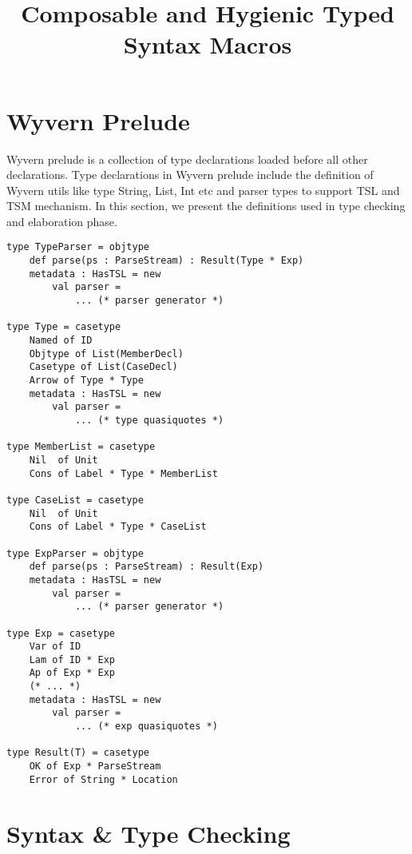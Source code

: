 \documentclass[letterpaper, notitlepage]{article}
\begin{document}
\title{Composable and Hygienic Typed Syntax Macros}
\maketitle

\section{Wyvern Prelude}
Wyvern prelude is a collection of type declarations loaded before all other declarations. Type declarations in Wyvern prelude include the definition of Wyvern utils like type String, List, Int etc and parser types to support TSL and TSM mechanism. In this section, we present the definitions used in type checking and elaboration phase. 
\begin{lstlisting}[style=wyvern]
type TypeParser = objtype
	def parse(ps : ParseStream) : Result(Type * Exp)
	metadata : HasTSL = new 
		val parser = 
			... (* parser generator *)

type Type = casetype
	Named of ID
	Objtype of List(MemberDecl)
	Casetype of List(CaseDecl)
	Arrow of Type * Type
	metadata : HasTSL = new
		val parser = 
			... (* type quasiquotes *)

type MemberList = casetype
	Nil  of Unit
	Cons of Label * Type * MemberList

type CaseList = casetype
	Nil  of Unit
	Cons of Label * Type * CaseList

type ExpParser = objtype
	def parse(ps : ParseStream) : Result(Exp)
	metadata : HasTSL = new 
		val parser = 
			... (* parser generator *)

type Exp = casetype
	Var of ID
	Lam of ID * Exp
	Ap of Exp * Exp
	(* ... *)
	metadata : HasTSL = new
		val parser = 
			... (* exp quasiquotes *)

type Result(T) = casetype
	OK of Exp * ParseStream
	Error of String * Location
\end{lstlisting}

\section{Syntax \& Type Checking}
\end{document}

